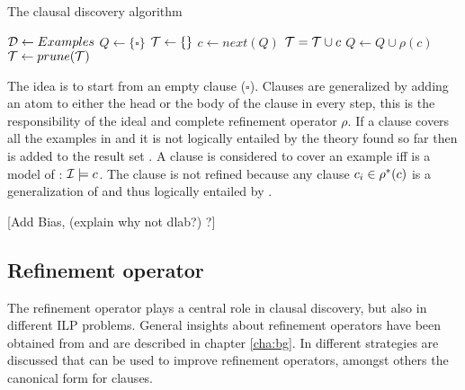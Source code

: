 \begin{algorithm}
	\caption{The clausal discovery algorithm}
	\label{alg:cd}

	\begin{algorithmic}
	\State $\mathcal{D} \gets Examples$
	\State $Q \gets \{\square\}$
	\State $\mathcal{T} \gets \{\}$
		\State $c \gets next(Q)$
				\State $\mathcal{T} = \mathcal{T} \cup c$
			\EndIf
		\Else
			\State $Q \gets Q \cup \rho(c)$
		\EndIf
	\EndWhile
	\State $\mathcal{T} \gets prune(\mathcal{T})$
	\State \Return {}
	\end{algorithmic}
\end{algorithm}

The idea is to start from an empty clause ($\square$). Clauses are generalized by adding an atom to either the head or the body of the clause in every step, this is the responsibility of the ideal and complete refinement operator $\rho$. If a clause  covers all the examples in  and it is not logically entailed by the theory found so far then  is added to the result set . A clause  is considered to cover an example  iff  is a model of : $\mathcal{I} \models c$. The clause  is not refined because any clause $c_i \in \rho^*(c)$ is a generalization of  and thus logically entailed by .

[Add Bias, (explain why not dlab?) ?]

\subsection{Refinement operator}
The refinement operator plays a central role in clausal discovery, but also in different ILP problems. General insights about refinement operators have been obtained from \cite{DeRaedt:LRLearning} and are described in chapter \ref{cha:bg}. In \cite{DeRaedt:CondensedRepresentations} different strategies are discussed that can be used to improve refinement operators, amongst others the canonical form for clauses.

